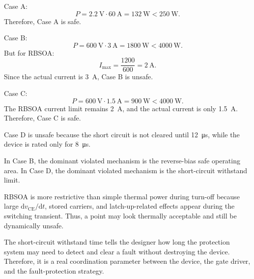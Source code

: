 
\begin{solutionblock}
    Case A:
    \begin{equation}
        P = \SI{2.2}{\volt} \cdot \SI{60}{\ampere} = \SI{132}{\watt} < \SI{250}{\watt}.
    \end{equation}
    Therefore, Case A is safe.

    Case B:
    \begin{equation}
        P = \SI{600}{\volt} \cdot \SI{3}{\ampere} = \SI{1800}{\watt} < \SI{4000}{\watt}.
    \end{equation}
    But for RBSOA:
    \begin{equation}
        I_\mathrm{max} = \frac{1200}{600} = \SI{2}{\ampere}.
    \end{equation}
    Since the actual current is \SI{3}{\ampere}, Case B is unsafe.

    Case C:
    \begin{equation}
        P = \SI{600}{\volt} \cdot \SI{1.5}{\ampere} = \SI{900}{\watt} < \SI{4000}{\watt}.
    \end{equation}
    The RBSOA current limit remains \SI{2}{\ampere}, and the actual current is only \SI{1.5}{\ampere}.
    Therefore, Case C is safe.

    Case D is unsafe because the short circuit is not cleared until \SI{12}{\micro\second}, while the device is rated only for \SI{8}{\micro\second}.
\end{solutionblock}


\begin{solutionblock}
    In Case B, the dominant violated mechanism is the reverse-bias safe operating area. 
    In Case D, the dominant violated mechanism is the short-circuit withstand limit.

    RBSOA is more restrictive than simple thermal power during turn-off because large $\mathrm{d}v_\mathrm{CE}/\mathrm{d}t$, stored carriers, and latch-up-related effects appear during the switching transient. 
    Thus, a point may look thermally acceptable and still be dynamically unsafe.
\end{solutionblock}


\begin{solutionblock}
    The short-circuit withstand time tells the designer how long the protection system may need to detect and clear a fault without destroying the device.
    Therefore, it is a real coordination parameter between the device, the gate driver, and the fault-protection strategy.
\end{solutionblock}
